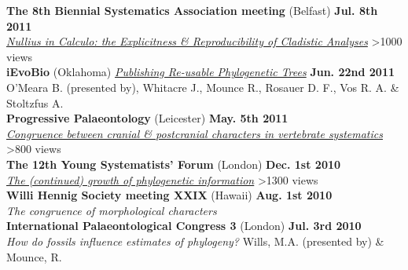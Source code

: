 \documentclass[margin,line]{resume}
\begin{document}
\begin{resume}
\vspace{-7 mm} 
    \textbf{The 8th Biennial Systematics Association meeting} (Belfast)
 \hfill \textbf{Jul. 8th 2011}\\
    \textsl{\href{http://prezi.com/rwyvfb9bvec_/nullius-in-calculo/}{Nullius in Calculo: the Explicitness \& Reproducibility of Cladistic Analyses}}\hfill {\color{red} \textgreater 1000 views}\\

\vspace{-7 mm} 
    \textbf{iEvoBio} (Oklahoma) \textsl{\href{http://dx.doi.org/10.1038/npre.2011.6048.1}{Publishing Re-usable Phylogenetic Trees}} \hfill \textbf{Jun. 22nd 2011}\\
    O'Meara B. (presented by), Whitacre J., Mounce R., Rosauer D. F., Vos R. A. \& Stoltzfus A.\\

\vspace{-7 mm} 
\textbf{Progressive Palaeontology} (Leicester)
 \hfill \textbf{May. 5th 2011}\\
    \textsl{\href{http://www.slideshare.net/rossmounce/progpal2011}{Congruence between cranial \& postcranial characters in vertebrate systematics}}\hfill {\color{red} \textgreater 800 views}\\

\vspace{-7 mm} 
\textbf{The 12th Young Systematists' Forum} (London)
 \hfill \textbf{Dec. 1st 2010}\\
    \textsl{\href{http://prezi.com/1s0lkatmc30t/the-continued-growth-of-phylogenetic-information/}{The (continued) growth of phylogenetic information}}\hfill {\color{red} \textgreater 1300 views}\\

\vspace{-7 mm} 
\textbf{Willi Hennig Society meeting XXIX} (Hawaii)
 \hfill \textbf{Aug. 1st 2010}\\
    \textsl{The congruence of morphological characters}\\

\vspace{-7 mm} 
\textbf{International Palaeontological Congress 3} (London)
 \hfill \textbf{Jul. 3rd 2010}\\
    \textsl{How do fossils influence estimates of phylogeny?} Wills, M.A. (presented by) \& Mounce, R. \\

\vspace{-7 mm}


\end{resume}
\end{document}
